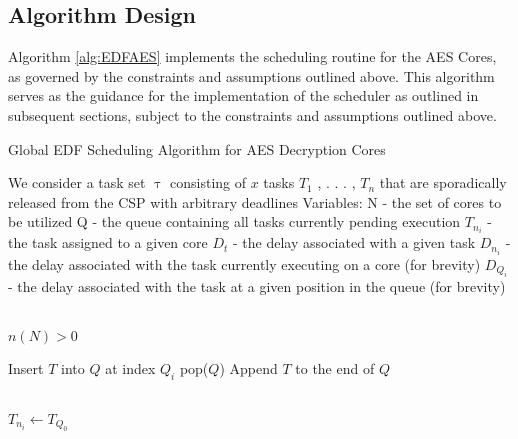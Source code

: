 \subsection{Algorithm Design}\label{subsec:AlgoImpl}
Algorithm \ref{alg:EDFAES} implements the scheduling routine for the AES Cores, as governed by the constraints and assumptions outlined above. This algorithm serves as the guidance for the implementation of the scheduler as outlined in subsequent sections, subject to the constraints and assumptions outlined above.
\begin{algorithm}
    \caption{Global EDF Scheduling Algorithm for AES Decryption Cores}\label{alg:EDFAES}
    \begin{algorithmic}

        \State We consider a task set $\uptau$ consisting of $x$ tasks $T_1$ , . . . , $T_n$ that are sporadically released from the CSP with arbitrary deadlines
        \State Variables: 
        \State N - the set of cores to be utilized
        \State Q - the queue containing all tasks currently pending execution
        \State $T_{n_i}$ - the task assigned to a given core
        \State $D_t$ - the delay associated with a given task
        \State $D_{n_i}$ - the delay associated with the task currently executing on a core (for brevity)
        \State $D_{Q_i}$ - the delay associated with the task at a given position in the queue (for brevity)

        \\

        \Require $n(N) > 0$ 

                    \State Insert $T$ into $Q$ at index $Q_i$
                    \State \Return pop($Q$)
                \EndIf
            \EndFor
            \State Append $T$ to the end of $Q$ 
        \EndFunction

        \\

         
                        \State $T_{n_i} \gets T_{Q_0}$ 


\end{algorithmic}
\end{algorithm}
